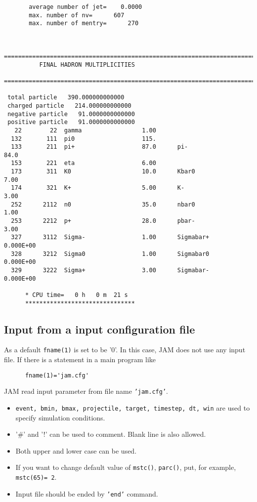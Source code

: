 \documentclass[]{article}
\newcommand{\ttt}[1]{{\tt#1}}
\begin{document}
\begin{verbatim}
       average number of jet=    0.0000
       max. number of nv=      607
       max. number of mentry=      270


 ==============================================================================
          FINAL HADRON MULTIPLICITIES
 ==============================================================================

 total particle   390.000000000000     
 charged particle   214.000000000000     
 negative particle   91.0000000000000     
 positive particle   91.0000000000000     
   22        22  gamma                 1.00    
  132       111  pi0                   115.    
  133       211  pi+                   87.0      pi-                   84.0    
  153       221  eta                   6.00    
  173       311  K0                    10.0      Kbar0                 7.00    
  174       321  K+                    5.00      K-                    3.00    
  252      2112  n0                    35.0      nbar0                 1.00    
  253      2212  p+                    28.0      pbar-                 3.00    
  327      3112  Sigma-                1.00      Sigmabar+            0.000E+00
  328      3212  Sigma0                1.00      Sigmabar0            0.000E+00
  329      3222  Sigma+                3.00      Sigmabar-            0.000E+00

      * CPU time=   0 h   0 m  21 s
      *******************************
\end{verbatim}

\subsection{Input from a input configuration file}
As a default \ttt{fname(1)} is set to be '0'.
In this case, JAM does not use any input file.
If there is a statement in a main program like
\begin{verbatim}
      fname(1)='jam.cfg'
\end{verbatim}
JAM read input parameter from file name \ttt{'jam.cfg'}.
\begin{itemize}
\item \ttt{event, bmin, bmax, projectile, target, timestep, dt, win}
      are used to specify simulation conditions.
\item '\#' and '!' can be used to comment.  Blank line is also allowed.
\item Both upper and lower case can be used.
\item If you want to change default value of \ttt{mstc()}, \ttt{parc()},
        put, for example, \ttt{mstc(65)= 2}.
\item Input file should be ended by \ttt{'end'} command.
\end{itemize}
\end{document}

